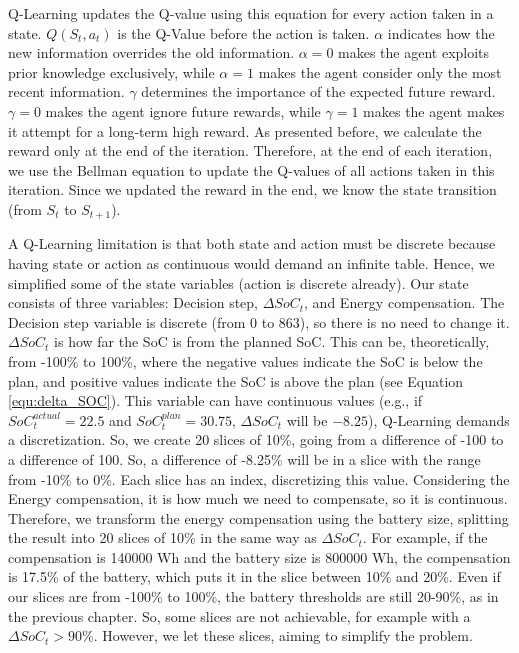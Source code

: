 Q-Learning updates the Q-value using this equation for every action taken in a state. $Q(S_t, a_t)$ is the Q-Value before the action is taken. $\alpha$ indicates how the new information overrides the old information. $\alpha = 0$ makes the agent exploits prior knowledge exclusively, while $\alpha = 1$ makes the agent consider only the most recent information. $\gamma$ determines the importance of the expected future reward. $\gamma = 0$ makes the agent ignore future rewards, while $\gamma = 1$ makes the agent makes it attempt for a long-term high reward. As presented before, we calculate the reward only at the end of the iteration. Therefore, at the end of each iteration, we use the Bellman equation to update the Q-values of all actions taken in this iteration. Since we updated the reward in the end, we know the state transition (from $S_{t}$ to $S_{t+1}$).

A Q-Learning limitation is that both state and action must be discrete because having state or action as continuous would demand an infinite table. Hence, we simplified some of the state variables (action is discrete already). Our state consists of three variables: Decision step, $\Delta SoC_t$, and Energy compensation. The Decision step variable is discrete (from 0 to 863), so there is no need to change it. $\Delta SoC_t$ is how far the SoC is from the planned SoC. This can be, theoretically, from -100\% to 100\%, where the negative values indicate the SoC is below the plan, and positive values indicate the SoC is above the plan (see Equation \ref{equ:delta_SOC}). This variable can have continuous values (e.g., if $SoC^{actual}_{t} = 22.5$ and $SoC^{plan}_{t} = 30.75$, $\Delta SoC_t$ will be $-8.25$), Q-Learning demands a discretization. So, we create 20 slices of 10\%, going from a difference of -100 to a difference of 100. So, a difference of -8.25\% will be in a slice with the range from -10\% to 0\%. Each slice has an index, discretizing this value. Considering the Energy compensation, it is how much we need to compensate, so it is continuous. Therefore, we transform the energy compensation using the battery size, splitting the result into 20 slices of 10\% in the same way as $\Delta SoC_t$. For example, if the compensation is 140000 Wh and the battery size is 800000 Wh, the compensation is 17.5\% of the battery, which puts it in the slice between 10\% and 20\%. Even if our slices are from -100\% to 100\%, the battery thresholds are still 20-90\%, as in the previous chapter. So, some slices are not achievable, for example with a $\Delta SoC_t > 90\%$. However, we let these slices, aiming to simplify the problem.

